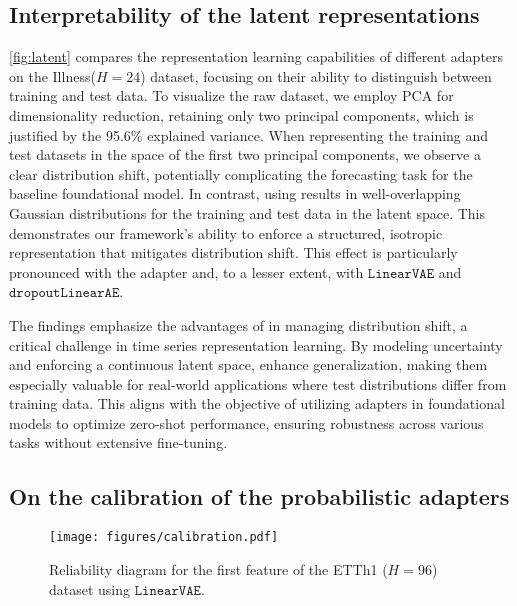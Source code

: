\subsection{Interpretability of the latent representations}

\cref{fig:latent} compares the representation learning capabilities of different adapters on the Illness($H=24$) dataset, focusing on their ability to distinguish between training and test data. To visualize the raw dataset, we employ PCA for dimensionality reduction, retaining only two principal components, which is justified by the 95.6\% explained variance. When representing the training and test datasets in the space of the first two principal components, we observe a clear distribution shift, potentially complicating the forecasting task for the baseline foundational model. In contrast, using \adapts results in well-overlapping Gaussian distributions for the training and test data in the latent space. This demonstrates our framework's ability to enforce a structured, isotropic representation that mitigates distribution shift. This effect is particularly pronounced with the \vae adapter and, to a lesser extent, with $\texttt{LinearVAE}$ and $\texttt{dropoutLinearAE}$.

The findings emphasize the advantages of \vae in managing distribution shift, a critical challenge in time series representation learning. By modeling uncertainty and enforcing a continuous latent space, \vae enhance generalization, making them especially valuable for real-world applications where test distributions differ from training data. This aligns with the objective of utilizing adapters in foundational models to optimize zero-shot performance, ensuring robustness across various tasks without extensive fine-tuning.

\subsection{On the calibration of the probabilistic adapters}

\begin{wrapfigure}{r}{0.2\textwidth}
  \begin{center}
  \vskip -0.1in
    \texttt{[image: figures/calibration.pdf]}
  \end{center}
  \caption{Reliability diagram for the first feature of the ETTh1 ($H=96$) dataset using $\texttt{LinearVAE}$.}
  \label{fig:calibration}
\end{wrapfigure}

